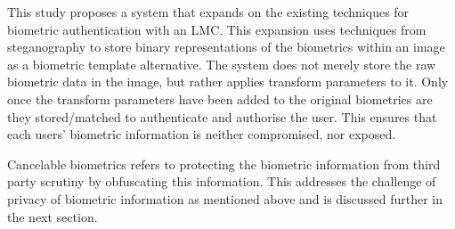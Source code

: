 This study proposes a system that expands on the existing techniques for biometric authentication with an LMC. This expansion uses techniques from steganography to store binary representations of the biometrics within an image as a biometric template alternative. The system does not merely store the raw biometric data in the image, but rather applies transform parameters to it. Only once the transform parameters have been added to the original biometrics are they stored/matched to authenticate and authorise the user. This ensures that each users’ biometric information is neither compromised, nor exposed. 

Cancelable biometrics refers to protecting the biometric information from third party scrutiny by obfuscating this information. This addresses the challenge of privacy of biometric information as mentioned above and is discussed further in the next section.


